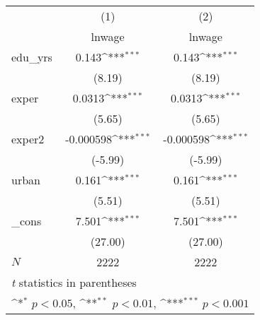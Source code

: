 {
\def\sym#1{\ifmmode^{#1}\else\(^{#1}\)\fi}
\begin{tabular}{l*{2}{c}}
\hline\hline
            &\multicolumn{1}{c}{(1)}&\multicolumn{1}{c}{(2)}\\
            &\multicolumn{1}{c}{lnwage}&\multicolumn{1}{c}{lnwage}\\
\hline
edu\_yrs     &       0.143\sym{***}&       0.143\sym{***}\\
            &      (8.19)         &      (8.19)         \\
[1em]
exper       &      0.0313\sym{***}&      0.0313\sym{***}\\
            &      (5.65)         &      (5.65)         \\
[1em]
exper2      &   -0.000598\sym{***}&   -0.000598\sym{***}\\
            &     (-5.99)         &     (-5.99)         \\
[1em]
urban       &       0.161\sym{***}&       0.161\sym{***}\\
            &      (5.51)         &      (5.51)         \\
[1em]
\_cons      &       7.501\sym{***}&       7.501\sym{***}\\
            &     (27.00)         &     (27.00)         \\
\hline
\(N\)       &        2222         &        2222         \\
\hline\hline
\multicolumn{3}{l}{\footnotesize \textit{t} statistics in parentheses}\\
\multicolumn{3}{l}{\footnotesize \sym{*} \(p<0.05\), \sym{**} \(p<0.01\), \sym{***} \(p<0.001\)}\\
\end{tabular}
}
